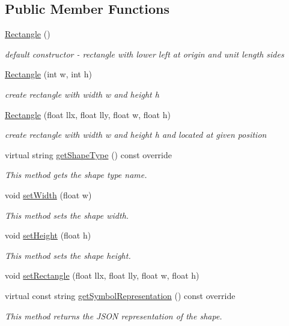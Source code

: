 \subsection*{Public Member Functions}
\begin{DoxyCompactItemize}
\item 
\hyperlink{classbridges_1_1datastructure_1_1_rectangle_a83c7e793c1335073c2a7093bbcf0c5bb}{Rectangle} ()
\begin{DoxyCompactList}\small\item\em default constructor -\/ rectangle with lower left at origin and unit length sides \end{DoxyCompactList}\item 
\hyperlink{classbridges_1_1datastructure_1_1_rectangle_a6e76090c00b4db625e96e4e23015acba}{Rectangle} (int w, int h)
\begin{DoxyCompactList}\small\item\em create rectangle with width w and height h \end{DoxyCompactList}\item 
\hyperlink{classbridges_1_1datastructure_1_1_rectangle_a8320f3a757733519e6513cdc20073e6e}{Rectangle} (float llx, float lly, float w, float h)
\begin{DoxyCompactList}\small\item\em create rectangle with width w and height h and located at given position \end{DoxyCompactList}\item 
virtual string \hyperlink{classbridges_1_1datastructure_1_1_rectangle_abb3d8cace529aae9a405909844ed1ae0}{get\+Shape\+Type} () const override
\begin{DoxyCompactList}\small\item\em This method gets the shape type name. \end{DoxyCompactList}\item 
void \hyperlink{classbridges_1_1datastructure_1_1_rectangle_a7f6182e74816a6c7cf83ae49d5ed55be}{set\+Width} (float w)
\begin{DoxyCompactList}\small\item\em This method sets the shape width. \end{DoxyCompactList}\item 
void \hyperlink{classbridges_1_1datastructure_1_1_rectangle_a6a3e99759282dd822c5615d1643f2a81}{set\+Height} (float h)
\begin{DoxyCompactList}\small\item\em This method sets the shape height. \end{DoxyCompactList}\item 
void \hyperlink{classbridges_1_1datastructure_1_1_rectangle_a931481ef10b4a7cbaca167c7d98c9467}{set\+Rectangle} (float llx, float lly, float w, float h)
\item 
virtual const string \hyperlink{classbridges_1_1datastructure_1_1_rectangle_a13fa4e45a78fdc7c49bfe566cb809ab3}{get\+Symbol\+Representation} () const override
\begin{DoxyCompactList}\small\item\em This method returns the J\+S\+ON representation of the shape. \end{DoxyCompactList}\end{DoxyCompactItemize}
